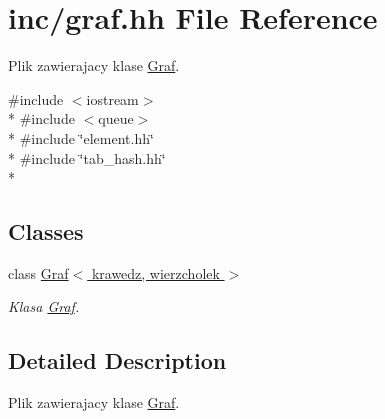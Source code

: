 \hypertarget{graf_8hh}{\section{inc/graf.hh File Reference}
\label{graf_8hh}
}


Plik zawierajacy klase \hyperlink{class_graf}{Graf}.  


{\ttfamily \#include $<$iostream$>$}\\*
{\ttfamily \#include $<$queue$>$}\\*
{\ttfamily \#include \char`\"{}element.\+hh\char`\"{}}\\*
{\ttfamily \#include \char`\"{}tab\+\_\+hash.\+hh\char`\"{}}\\*
\subsection*{Classes}
\begin{DoxyCompactItemize}
\item 
class \hyperlink{class_graf}{Graf$<$ krawedz, wierzcholek $>$}
\begin{DoxyCompactList}\small\item\em Klasa \hyperlink{class_graf}{Graf}. \end{DoxyCompactList}\end{DoxyCompactItemize}


\subsection{Detailed Description}
Plik zawierajacy klase \hyperlink{class_graf}{Graf}. 

